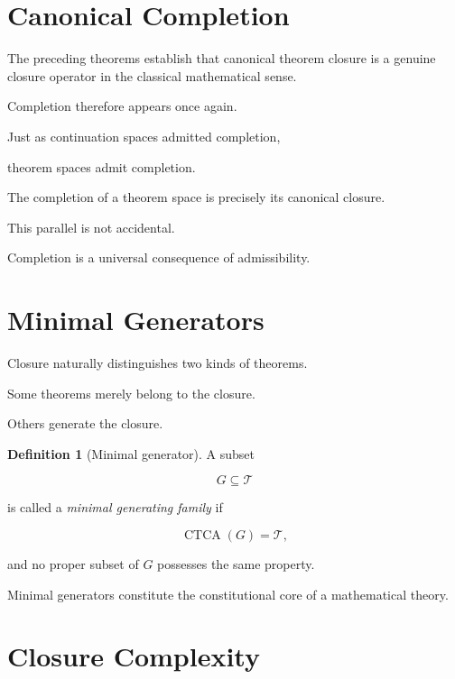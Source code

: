\documentclass[13pt,openany]{book}
\theoremstyle{plain}
\theoremstyle{definition}
\newtheorem{definition}{Definition}[chapter]
\begin{document}
\section{Canonical Completion}

The preceding theorems establish that canonical theorem closure is a genuine
closure operator in the classical mathematical sense.

Completion therefore appears once again.

Just as continuation spaces admitted completion,

theorem spaces admit completion.

The completion of a theorem space is precisely its canonical closure.

This parallel is not accidental.

Completion is a universal consequence of admissibility.

\section{Minimal Generators}

Closure naturally distinguishes two kinds of theorems.

Some theorems merely belong to the closure.

Others generate the closure.

\begin{definition}[Minimal generator]
A subset

\[
G
\subseteq
\mathcal T
\]

is called a \emph{minimal generating family} if

\[
\operatorname{CTCA}(G)
=
\mathcal T,
\]

and no proper subset of
\(G\)
possesses the same property.

\end{definition}

Minimal generators constitute the constitutional core of a mathematical
theory.

\section{Closure Complexity}
\end{document}
